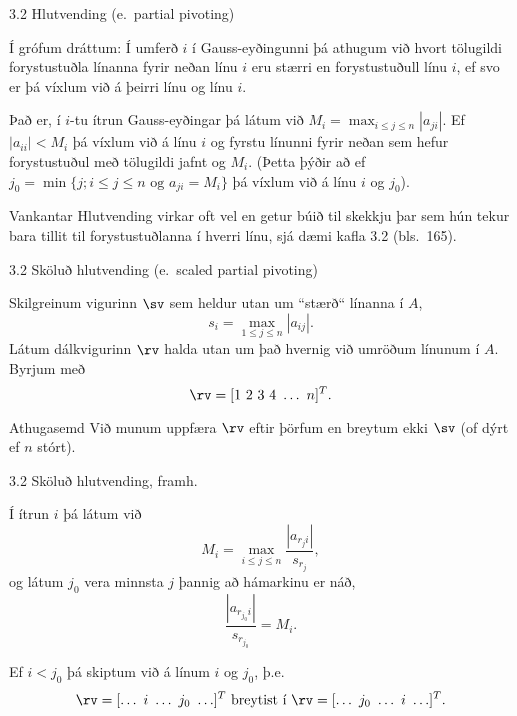 \begin{frame}{3.2 Hlutvending (e.~partial pivoting)}
\begin{block}{}
 Í grófum dráttum: Í umferð $i$ í Gauss-eyðingunni þá athugum við hvort tölugildi 
forystu\-stuðla línanna fyrir neðan
línu $i$ eru stærri en forystustuðull línu $i$, ef svo er þá víxlum við á 
þeirri línu og línu $i$.

\pause
\medskip

Það er, í $i$-tu ítrun Gauss-eyðingar þá látum við $M_i = \max_{i\leq j \leq n} |a_{ji}|$.
Ef $|a_{ii}| < M_i$ þá víxlum við á línu $i$ og fyrstu línunni fyrir neðan 
sem hefur forystustuðul með tölugildi jafnt og $M_i$. \pause (Þetta þýðir að ef 
$j_0 = \min\{ j ; i \leq j\leq n \text{ og } a_{ji} = M_i \}$ þá víxlum við á línu $i$ og $j_0$).
\end{block}

\pause
\begin{block}{Vankantar}
Hlutvending virkar oft vel en getur búið til skekkju þar sem hún tekur bara tillit til
forystustuðlanna í hverri línu, sjá dæmi kafla 3.2 (bls.~165). 
\end{block}
\end{frame}

\begin{frame}{3.2 Sköluð hlutvending (e.~scaled partial pivoting)}
 \begin{block}{}
  Skilgreinum vigurinn $\sv$ sem heldur utan um ``stærð`` línanna í $A$,
$$
s_i = \max_{1\leq j \leq n} |a_{ij}|.
$$
\pause
Látum dálkvigurinn $\rv$ halda utan um það hvernig við umröðum línunum í $A$.
Byrjum með
$$
\rv = [1\ 2\ 3\ 4\ \ldots\ n]^T.
$$
\end{block}
\pause


\begin{block}{Athugasemd} 
Við munum uppfæra $\rv$ eftir þörfum en breytum ekki $\sv$ (of dýrt ef $n$ stórt). 
\end{block}

\end{frame}

\begin{frame}{3.2 Sköluð hlutvending, framh.}
\begin{block}{}
Í ítrun $i$ þá látum við 
$$
M_i = \max_{i \leq j \leq n} \frac{|a_{{r_j}i}|}{s_{r_j}},
$$
og látum $j_0$ vera minnsta $j$ þannig að hámarkinu er náð, 
$$
\frac{ |a_{r_{j_0}i}|}{s_{r_{j_0}}} = M_i.
$$
\pause

Ef $i < j_0$ þá skiptum við á línum $i$ og $j_0$, \pause þ.e.
$$
\rv = [\ldots\ i\ \ldots\ j_0\ \ldots]^T \text{ breytist í }
\rv = [\ldots\ j_0\ \ldots\ i\ \ldots]^T.
$$
 \end{block}
\end{frame}


